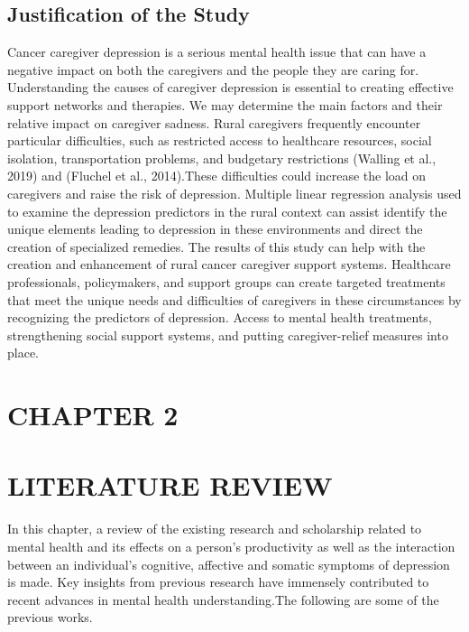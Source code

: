 \documentclass[12pt]{article}
\numberwithin{equation}{section}
\begin{document}
\subsection{Justification of the Study}
Cancer caregiver depression is a serious mental health issue that can have a negative impact on both the caregivers and the people they are caring for. Understanding the causes of caregiver depression is essential to creating effective support networks and therapies. We may determine the main factors and their relative impact on caregiver sadness. Rural caregivers frequently encounter particular difficulties, such as restricted access to healthcare resources, social isolation, transportation problems, and budgetary restrictions (Walling et al., 2019) and (Fluchel et al., 2014).These difficulties could increase the load on caregivers and raise the risk of depression. Multiple linear regression analysis used to examine the depression predictors in the rural context can assist identify the unique elements leading to depression in these environments and direct the creation of specialized remedies. The results of this study can help with the creation and enhancement of rural cancer caregiver support systems. Healthcare professionals, policymakers, and support groups can create targeted treatments that meet the unique needs and difficulties of caregivers in these circumstances by recognizing the predictors of depression. Access to mental health treatments, strengthening social support systems, and putting caregiver-relief measures into place.

\newpage
	\section*{CHAPTER 2}
	\section*{LITERATURE REVIEW}
	In this chapter, a review of the existing research and scholarship related to mental health and its effects on a person's productivity as well as the interaction between an individual's cognitive, affective and somatic symptoms of depression is made. Key insights from previous research have immensely contributed to recent advances in mental health understanding.The following are some of the previous works.\\
	
\end{document}
